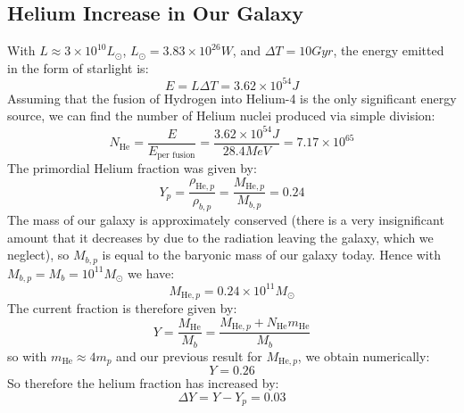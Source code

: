\subsection{Helium Increase in Our Galaxy}
With $L \approx 3 \times 10^{10}L_{\odot}$, $L_{\odot} = 3.83\times 10^{26}\si{W}$, and $\Delta T = 10\si{Gyr}$, the energy emitted in the form of starlight is:
\begin{equation}
    \boxed{E = L\Delta T = 3.62 \times 10^{54}\si{J}}
\end{equation}
Assuming that the fusion of Hydrogen into Helium-4 is the only significant energy source, we can find the number of Helium nuclei produced via simple division:
\begin{equation}
    N_{\text{He}} = \frac{E}{E_{\text{per fusion}}} = \frac{3.62 \times 10^{54}\si{J}}{28.4\si{MeV}} = 7.17\times 10^{65}
\end{equation}
The primordial Helium fraction was given by:
\begin{equation}
    Y_p = \frac{\rho_{\text{He}, p}}{\rho_{b, p}} = \frac{M_{\text{He}, p}}{M_{b, p}} = 0.24
\end{equation}
The mass of our galaxy is approximately conserved (there is a very insignificant amount that it decreases by due to the radiation leaving the galaxy, which we neglect), so $M_{b, p}$ is equal to the baryonic mass of our galaxy today. Hence with $M_{b, p} = M_b = 10^{11}M_{\odot}$ we have:
\begin{equation}
    M_{\text{He}, p} = 0.24 \times 10^{11} M_\odot
\end{equation}
The current fraction is therefore given by:
\begin{equation}
    Y = \frac{M_{\text{He}}}{M_b} = \frac{M_{\text{He}, p} + N_{\text{He}}m_{\text{He}}}{M_b}
\end{equation}
so with $m_{\text{He}} \approx 4m_p$ and our previous result for $M_{\text{He}, p}$, we obtain numerically:
\begin{equation}
    Y = 0.26
\end{equation}
So therefore the helium fraction has increased by:
\begin{equation}
    \boxed{\Delta Y = Y - Y_p = 0.03}
\end{equation}


